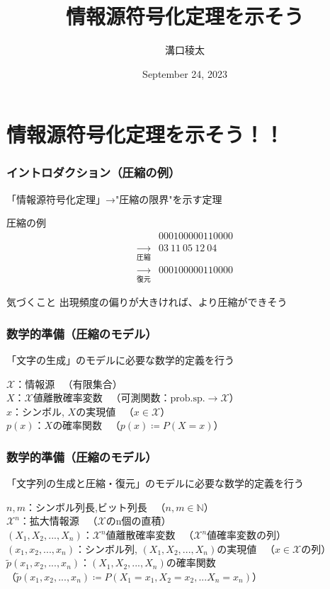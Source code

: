\documentclass{classes/myslide}
\title{情報源符号化定理を示そう}
\author{溝口稜太}
\institute{創域理工学部情報計算科学科４年}
\date{September 24, 2023}
\begin{document}
\section{情報源符号化定理を示そう！！}

\begin{frame}
  \titlepage
\end{frame}

\begin{frame}\frametitle{イントロダクション（圧縮の例）}

  「情報源符号化定理」→"圧縮の限界"を示す定理

  \begin{exampleblock}{圧縮の例}
    \begin{align*}
      &000100000110000 \\
      \xrightarrow[圧縮]{} & 03 \ 11 \ 05 \ 12 \ 04 \\
      \xrightarrow[復元]{} & 000100000110000 
    \end{align*}
  \end{exampleblock}

  \begin{alertblock}{気づくこと}
    出現頻度の偏りが大きければ、より圧縮ができそう
  \end{alertblock}

\end{frame}

\begin{frame}\frametitle{数学的準備（圧縮のモデル）}
  「文字の生成」のモデルに必要な数学的定義を行う
  \begin{definition}[]
    $\mathcal{X}$：情報源 \ （有限集合）\\
    $X$：$\mathcal{X}$値離散確率変数 \ （可測関数：$\mathrm{prob. sp.} \rightarrow \mathcal{X}$）\\
    $x$：シンボル, $X$の実現値 \ （$ x \in \mathcal{X}$） \\
    $p(x)$：$X$の確率関数 \ （$p(x) \coloneq P(X = x)$）
  \end{definition}
\end{frame}

\begin{frame}\frametitle{数学的準備（圧縮のモデル）}
  「文字列の生成と圧縮・復元」のモデルに必要な数学的定義を行う
  \begin{definition}[]
    $n, m$：シンボル列長,ビット列長 \ （$n, m \in \mathbb{N}$）\\
    $\mathcal{X}^n$：拡大情報源 \ （$\mathcal{X}の$n$個の直積$）\\
    $(X_1, X_2, ..., X_n)$：$\mathcal{X}^n$値離散確率変数 \ （$\mathcal{X}^n$値確率変数の列）\\
    $(x_1, x_2, ..., x_n )$：シンボル列, $(X_1, X_2, ..., X_n)$の実現値 \ （$ x \in \mathcal{X}$の列）\\
    $\tilde{p}(x_1, x_2, ..., x_n )$：$(X_1, X_2, ..., X_n)$の確率関数 \\（$\tilde{p}(x_1, x_2, ..., x_n ) \coloneq P(X_1 = x_1, X_2 = x_2,... X_n = x_n)$）
  \end{definition}
\end{frame}
\end{document}
